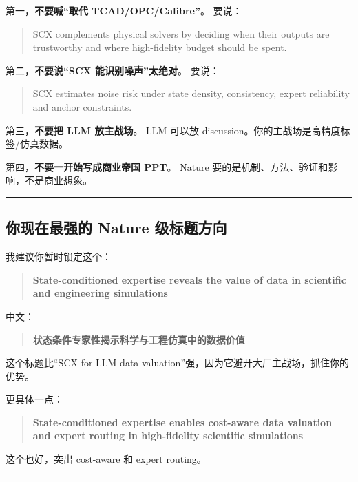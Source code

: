 \documentclass[
  12pt,
]{ctexart}
\begin{document}
第一，\textbf{不要喊``取代 TCAD/OPC/Calibre''}。 要说：

\begin{quote}
SCX complements physical solvers by deciding when their outputs are
trustworthy and where high-fidelity budget should be spent.
\end{quote}

第二，\textbf{不要说``SCX 能识别噪声''太绝对}。 要说：

\begin{quote}
SCX estimates noise risk under state density, consistency, expert
reliability and anchor constraints.
\end{quote}

第三，\textbf{不要把 LLM 放主战场}。 LLM 可以放
discussion。你的主战场是高精度标签/仿真数据。

第四，\textbf{不要一开始写成商业帝国 PPT}。 Nature
要的是机制、方法、验证和影响，不是商业想象。

\begin{center}\rule{0.5\linewidth}{0.5pt}\end{center}

\subsection{你现在最强的 Nature
级标题方向}\label{ux4f60ux73b0ux5728ux6700ux5f3aux7684-nature-ux7ea7ux6807ux9898ux65b9ux5411}

我建议你暂时锁定这个：

\begin{quote}
\textbf{State-conditioned expertise reveals the value of data in
scientific and engineering simulations}
\end{quote}

中文：

\begin{quote}
\textbf{状态条件专家性揭示科学与工程仿真中的数据价值}
\end{quote}

这个标题比``SCX for LLM data
valuation''强，因为它避开大厂主战场，抓住你的优势。

更具体一点：

\begin{quote}
\textbf{State-conditioned expertise enables cost-aware data valuation
and expert routing in high-fidelity scientific simulations}
\end{quote}

这个也好，突出 cost-aware 和 expert routing。

\begin{center}\rule{0.5\linewidth}{0.5pt}\end{center}
\end{document}
